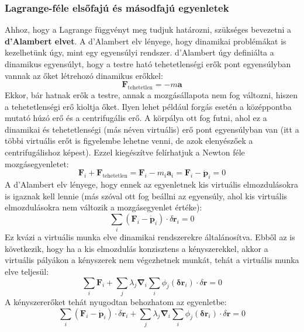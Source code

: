 \documentclass[../main.tex]{subfiles}
\begin{document}
\subsubsection{Lagrange-féle elsőfajú és másodfajú egyenletek}
Ahhoz, hogy a Lagrange függvényt meg tudjuk határozni, szükséges bevezetni a \textbf{d'Alambert elvet}. A d'Alambert elv lényege, hogy dinamikai problémákat is kezelhetünk úgy, mint egy egyensúlyi rendszer. d'Alambert úgy definiálta a dinamikus egyensúlyt, hogy a testre ható tehetetlenségi erők pont egyensúlyban vannak az őket létrehozó dinamikus erőkkel:
\begin{equation}
    \mathbf{F}_{\text{tehetetlen}} = - m\mathbf{a}
\end{equation}
Ekkor, bár hatnak erők a testre, annak a mozgásállapota nem fog változni, hiszen a tehetetlenségi erő kioltja őket. Ilyen lehet például forgás esetén a középpontba mutató húzó erő és a centrifugális erő. A körpálya ott fog futni, ahol ez a dinamikai és tehetetlenségi (más néven virtuális) erő pont egyensúlyban van (itt a többi virtuális erőt is figyelembe lehetne venni, de azok elenyészőek a centrifugálishoz képest). Ezzel kiegészítve felírhatjuk a Newton féle mozgásegyenletet:
\begin{equation}
    \mathbf{F}_i + \mathbf{F}_{\text{tehetetlen}} = \mathbf{F}_i - m_i \mathbf{a}_i = \mathbf{F}_i - \mathbf{\dot{p}}_i = 0
\end{equation}
A d'Alambert elv lényege, hogy ennek az egyenletnek kis virtuális elmozdulásokra is igaznak kell lennie (más szóval ott fog beállni az egyensúly, ahol kis virtuális elmozdulásokra nem változik a mozgásegyenlet értéke):
\begin{equation}
    \sum_i (\mathbf{F}_i - \mathbf{\dot{p}}_i) \cdot \delta\mathbf{r}_i = 0
\end{equation}
Ez kvázi a virtuális munka elve dinamikai rendszerekre általánosítva. Ebből az is következik, hogy ha a kis elmozdulás konzisztens a kényszerekkel, akkor a virtuális pályákon a kényszerek nem végezhetnek munkát, tehát a virtuális munka elve teljesül:
\begin{equation}
    \sum_i \mathbf{F}_i + \sum_j \lambda_j \boldsymbol{\nabla}_i \sum_i \phi_j(\mathbf{\delta r}_i) \cdot \delta \mathbf{r} = 0
\end{equation}
A kényszererőket tehát nyugodtan behozhatom az egyenletbe:
\begin{equation}
    \sum_i (\mathbf{F}_i - \mathbf{\dot{p}}_i) \cdot \delta\mathbf{r}_i + \sum_j \lambda_j \boldsymbol{\nabla}_i \sum_i \phi_j(\mathbf{\delta r}_i) \cdot \delta \mathbf{r} = 0
\end{equation}
\end{document}
